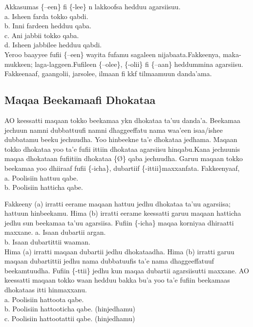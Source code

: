 \documentclass[11pt,b5paper]{book}
\begin{document}
Akkasumas \{–een\} fi \{-lee\} n lakkoofsa hedduu agarsiisuu. \\
a. Isheen farda tokko qabdi.\\
b. Inni fardeen hedduu qaba.\\
c. Ani jabbii tokko qaba.\\
d. Isheen jabbilee hedduu qabdi. \\

Yeroo baayyee fufii \{–een\} wayita fufamu sagaleen nijabaata.Fakkeenya, maka-mukkeen; laga-laggeen.Fufileen \{–olee\}, \{-olii\} fi \{–aan\} heddummina agarsiisu. Fakkeenaaf,
gaangolii, jarsolee, ilmaan fi kkf tilmaamuun danda'ama.

\subsection{Maqaa Beekamaafi Dhokataa}

AO keessatti maqaan tokko beekamaa ykn dhokataa ta'uu danda'a. Beekamaa
jechuun namni dubbattuufi namni dhaggeeffatu nama waa’een isaa/ishee dubbatamu beeku jechuudha. Yoo hinbeekne ta’e dhokataa jedhama. Maqaan tokko dhokataa yoo ta'e fufii ittiin dhokataa agarsiisu hinqabu.Kana jechuunis maqaa dhokataan fufiitiin dhokataa \{Ø\} qaba jechuudha. Garuu maqaan tokko beekamaa yoo dhiiraaf fufii \{-icha\}, dubartiif \{-ittii\}maxxanfata. Fakkeenyaaf,\\
a. Poolisiin hattuu qabe.\\
b. Poolisiin hatticha qabe. 

Fakkeeny (a) irratti eerame maqaan hattuu jedhu dhokataa ta'uu agarsiisa; hattuun hinbeekamu. Hima (b) irratti eerame keessatti garuu maqaan hatticha jedhu sun beekamaa ta'uu agarsiisa. Fufiin \{-icha\} maqaa korniyaa dhiraatti maxxane. 
a. Isaan dubartii argan.\\
b. Isaan dubartittii waaman. \\

Hima (a) irratti maqaan dubartii jedhu dhokataadha. Hima (b) irratti garuu maqaan dubartittii jedhu nama dubbatuufis ta'e nama dhaggeeffatuuf beekamtuudha. Fufiin \{-ttii\} jedhu kun maqaa dubartii agarsiisutti maxxane. AO keessatti maqaan tokko waan hedduu bakka bu'a yoo ta'e fufiin beekamaas dhokataas itti hinmaxxanu.\\
a. Poolisiin hattoota qabe.\\
b. Poolisiin hattooticha qabe. (hinjedhamu)\\
c. Poolisiin hattootattii qabe. (hinjedhamu)\\
\end{document}
